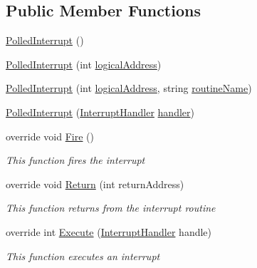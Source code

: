 \subsection*{Public Member Functions}
\begin{DoxyCompactItemize}
\item 
\hyperlink{class_c_p_u___o_s___simulator_1_1_c_p_u_1_1_interrupts_1_1_polled_interrupt_aceea1d043ea479a2bf84f64d340d1179}{Polled\+Interrupt} ()
\item 
\hyperlink{class_c_p_u___o_s___simulator_1_1_c_p_u_1_1_interrupts_1_1_polled_interrupt_aa4468229155becd3fc364a030e72d64b}{Polled\+Interrupt} (int \hyperlink{class_c_p_u___o_s___simulator_1_1_c_p_u_1_1_interrupts_1_1_polled_interrupt_aa6323958769981e464a31ae232bdf674}{logical\+Address})
\item 
\hyperlink{class_c_p_u___o_s___simulator_1_1_c_p_u_1_1_interrupts_1_1_polled_interrupt_ab782f37cfe483fde7b44eec877bba855}{Polled\+Interrupt} (int \hyperlink{class_c_p_u___o_s___simulator_1_1_c_p_u_1_1_interrupts_1_1_polled_interrupt_aa6323958769981e464a31ae232bdf674}{logical\+Address}, string \hyperlink{class_c_p_u___o_s___simulator_1_1_c_p_u_1_1_interrupts_1_1_polled_interrupt_aae22e2a06e7fe7a29de97a719c31432b}{routine\+Name})
\item 
\hyperlink{class_c_p_u___o_s___simulator_1_1_c_p_u_1_1_interrupts_1_1_polled_interrupt_ad752278b7630e59c29c9f434970d81cf}{Polled\+Interrupt} (\hyperlink{class_c_p_u___o_s___simulator_1_1_c_p_u_1_1_interrupts_1_1_interrupt_handler}{Interrupt\+Handler} \hyperlink{class_c_p_u___o_s___simulator_1_1_c_p_u_1_1_interrupts_1_1_polled_interrupt_ae7228477097987fa61e837479bad2696}{handler})
\item 
override void \hyperlink{class_c_p_u___o_s___simulator_1_1_c_p_u_1_1_interrupts_1_1_polled_interrupt_a903fa1b1c14ccf05f37a2b671628fa6e}{Fire} ()
\begin{DoxyCompactList}\small\item\em This function fires the interrupt \end{DoxyCompactList}\item 
override void \hyperlink{class_c_p_u___o_s___simulator_1_1_c_p_u_1_1_interrupts_1_1_polled_interrupt_a1d9e899d937f97808acaef3060e9e950}{Return} (int return\+Address)
\begin{DoxyCompactList}\small\item\em This function returns from the interrupt routine \end{DoxyCompactList}\item 
override int \hyperlink{class_c_p_u___o_s___simulator_1_1_c_p_u_1_1_interrupts_1_1_polled_interrupt_ae53fdc5d42eee44061cc45f67bda9909}{Execute} (\hyperlink{class_c_p_u___o_s___simulator_1_1_c_p_u_1_1_interrupts_1_1_interrupt_handler}{Interrupt\+Handler} handle)
\begin{DoxyCompactList}\small\item\em This function executes an interrupt \end{DoxyCompactList}\end{DoxyCompactItemize}
